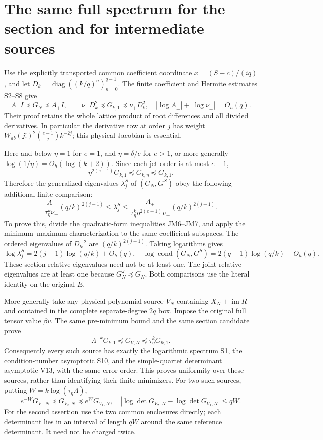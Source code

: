 \documentclass[11pt]{article}
\begin{document}
\section{The same full spectrum for the section and for intermediate sources}
Use the explicitly transported common coefficient coordinate
$x=(S-c)/(iq)$, and let
$D_k=\operatorname{diag}((k/q)^n)_{n=0}^{q-1}$.
The finite coefficient and Hermite estimates S2--S8 give
\[
 A_-I\preceq G_N\preceq A_+I,\qquad
 \nu_-D_k^2\preceq G_{k,1}\preceq\nu_+D_k^2,
 \quad |\log A_\pm|+|\log\nu_\pm|=O_h(q).\tag{JM6}
\]
Their proof retains the whole lattice product of root differences
and all divided derivatives. In particular the derivative row at
order $j$ has weight
$W_{ab}(j!)^2\binom{e-1}{j}k^{-2j}$; this physical Jacobian is essential.

Here and below $\eta=1$ for $e=1$, and $\eta=\delta/e$ for $e>1$,
or more generally $\log(1/\eta)=O_h(\log(k+2))$.
Since each jet order is at most $e-1$,
\[
 \eta^{2(e-1)}G_{k,1}\preceq G_{k,\eta}\preceq G_{k,1}.
 \tag{JM7}
\]
Therefore the generalized eigenvalues $\lambda^S_j$ of $(G_N,G^S)$
obey the following additional finite comparison:
\[
 \frac{A_-}{\tau_\eta^k\nu_+}(q/k)^{2(j-1)}
 \le\lambda^S_j\le
 \frac{A_+}{\tau_\eta^k\eta^{2(e-1)}\nu_-}(q/k)^{2(j-1)}.
 \tag{JM8}
\]
To prove this, divide the quadratic-form inequalities JM6--JM7,
and apply the minimum--maximum characterization to the same
coefficient subspaces. The ordered eigenvalues of $D_k^{-2}$ are
$(q/k)^{2(j-1)}$. Taking logarithms gives
\[
 \log\lambda^S_j=2(j-1)\log(q/k)+O_h(q),\quad
 \log\operatorname{cond}(G_N,G^S)
 =2(q-1)\log(q/k)+O_h(q).\tag{JM9}
\]
These section-relative eigenvalues need not be at least one.
The joint-relative eigenvalues are at least one because $G_N^J\preceq G_N$.
Both comparisons use the literal identity on the original $E$.

More generally take any physical polynomial source $V_N$ containing
$X_N+\operatorname{im}R$ and contained in the complete separate-degree
$2q$ box. Impose the original full tensor value $\beta v$.
The same pre-minimum bound and the same section candidate prove
\[
 \Lambda^{-k}G_{k,1}\preceq G_{V,N}\preceq\tau_\eta^kG_{k,1}.
 \tag{JM10}
\]
Consequently every such source has exactly the logarithmic spectrum
S1, the condition-number asymptotic S10, and the simple-quartet
determinant asymptotic V13, with the same error order. This proves
uniformity over these sources, rather than identifying their finite
minimizers. For two such sources, putting $W=k\log(\tau_\eta\Lambda)$,
\[
 e^{-W}G_{V_1,N}\preceq G_{V_2,N}\preceq e^WG_{V_1,N},\quad
 |\log\det G_{V_2,N}-\log\det G_{V_1,N}|\le qW.\tag{JM11}
\]
For the second assertion use the two common enclosures directly;
each determinant lies in an interval of length $qW$ around the
same reference determinant. It need not be charged twice.
\end{document}
